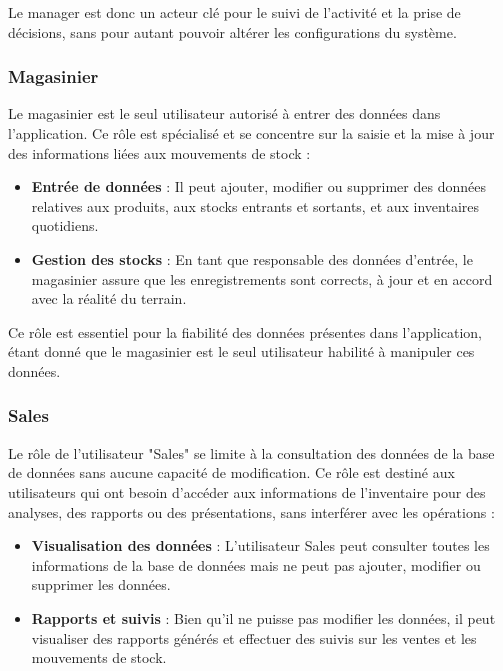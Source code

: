 \documentclass[a4paper, oneside, 12pt, final]{extreport}
\begin{document}
Le manager est donc un acteur clé pour le suivi de l'activité et la prise de décisions, sans pour autant pouvoir altérer les configurations du système.

\subsubsection{Magasinier}

Le magasinier est le seul utilisateur autorisé à entrer des données dans l'application. Ce rôle est spécialisé et se concentre sur la saisie et la mise à jour des informations liées aux mouvements de stock :

\begin{itemize}
    \item \textbf{Entrée de données} : Il peut ajouter, modifier ou supprimer des données relatives aux produits, aux stocks entrants et sortants, et aux inventaires quotidiens.
    \item \textbf{Gestion des stocks} : En tant que responsable des données d'entrée, le magasinier assure que les enregistrements sont corrects, à jour et en accord avec la réalité du terrain.
\end{itemize}

Ce rôle est essentiel pour la fiabilité des données présentes dans l'application, étant donné que le magasinier est le seul utilisateur habilité à manipuler ces données.

\subsubsection{Sales}

Le rôle de l'utilisateur "Sales" se limite à la consultation des données de la base de données sans aucune capacité de modification. Ce rôle est destiné aux utilisateurs qui ont besoin d'accéder aux informations de l'inventaire pour des analyses, des rapports ou des présentations, sans interférer avec les opérations :

\begin{itemize}
    \item \textbf{Visualisation des données} : L'utilisateur Sales peut consulter toutes les informations de la base de données mais ne peut pas ajouter, modifier ou supprimer les données.
    \item \textbf{Rapports et suivis} : Bien qu'il ne puisse pas modifier les données, il peut visualiser des rapports générés et effectuer des suivis sur les ventes et les mouvements de stock.
\end{itemize}
\end{document}
